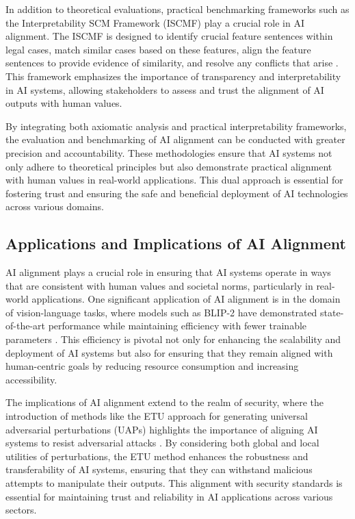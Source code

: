 In addition to theoretical evaluations, practical benchmarking frameworks such as the Interpretability SCM Framework (ISCMF) play a crucial role in AI alignment. The ISCMF is designed to identify crucial feature sentences within legal cases, match similar cases based on these features, align the feature sentences to provide evidence of similarity, and resolve any conflicts that arise \cite{lin2023interpretabilityframeworksimilarcase}. This framework emphasizes the importance of transparency and interpretability in AI systems, allowing stakeholders to assess and trust the alignment of AI outputs with human values.

By integrating both axiomatic analysis and practical interpretability frameworks, the evaluation and benchmarking of AI alignment can be conducted with greater precision and accountability. These methodologies ensure that AI systems not only adhere to theoretical principles but also demonstrate practical alignment with human values in real-world applications. This dual approach is essential for fostering trust and ensuring the safe and beneficial deployment of AI technologies across various domains.




\subsection{Applications and Implications of AI Alignment} \label{subsec:Applications and Implications of AI Alignment}

AI alignment plays a crucial role in ensuring that AI systems operate in ways that are consistent with human values and societal norms, particularly in real-world applications. One significant application of AI alignment is in the domain of vision-language tasks, where models such as BLIP-2 have demonstrated state-of-the-art performance while maintaining efficiency with fewer trainable parameters \cite{li2023blip}. This efficiency is pivotal not only for enhancing the scalability and deployment of AI systems but also for ensuring that they remain aligned with human-centric goals by reducing resource consumption and increasing accessibility.



The implications of AI alignment extend to the realm of security, where the introduction of methods like the ETU approach for generating universal adversarial perturbations (UAPs) highlights the importance of aligning AI systems to resist adversarial attacks \cite{zhang2024universaladversarialperturbationsvisionlanguage}. By considering both global and local utilities of perturbations, the ETU method enhances the robustness and transferability of AI systems, ensuring that they can withstand malicious attempts to manipulate their outputs. This alignment with security standards is essential for maintaining trust and reliability in AI applications across various sectors.



